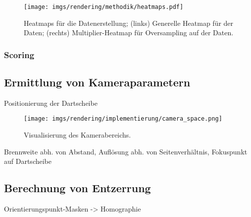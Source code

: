 \todo{}

\begin{figure}
    \centering
    \texttt{[image: imgs/rendering/methodik/heatmaps.pdf]}
    \caption{Heatmaps für die Datenerstellung; (links) Generelle Heatmap für  der Daten; (rechts) Multiplier-Heatmap für Oversampling auf  der Daten.}
    \label{img:heatmaps}
\end{figure}

\subsubsection{Scoring}

\todo{}

\subsection{Ermittlung von Kameraparametern}  %
\label{sec:ermittlung_kameraparamater}

Positionierung der Dartscheibe

\begin{figure}
    \centering
    \texttt{[image: imgs/rendering/implementierung/camera\_space.png]}
    \caption{Visualisierung des Kamerabereichs.}
    \label{img:camera_space}
\end{figure}

Brennweite abh. von Abstand,
Auflösung abh. von Seitenverhältnis,
Fokuspunkt auf Dartscheibe

\todo{}

\subsection{Berechnung von Entzerrung}  %
\label{sec:berechnung_entzerrung}

Orientierungspunkt-Masken -> Homographie

\todo{}

